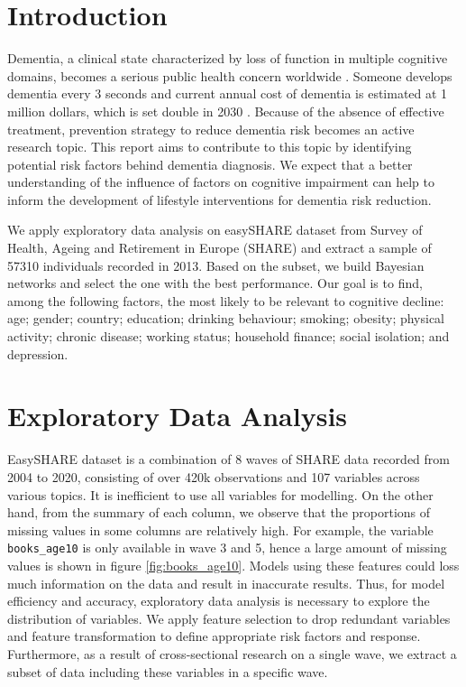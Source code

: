 \documentclass[11pt,twoside]{article}
\numberwithin{Theorem}{section}
\numberwithin{Definition}{section}
\numberwithin{Lemma}{section}
\numberwithin{Algorithm}{section}
\numberwithin{equation}{section}
\begin{document}
\tableofcontents

\setcounter{page}{1}

\nocite{*}

\clearpage

\section{Introduction}
\label{sec:intro}

Dementia, a clinical state characterized by loss of function in multiple cognitive domains, becomes a serious public health concern worldwide \cite{seixas2014bayesian}. Someone develops dementia every 3 seconds and current annual cost of dementia is estimated at 1 million dollars, which is set double in 2030 \cite{alzheimer2019world}. Because of the absence of effective treatment, prevention strategy to reduce dementia risk becomes an active research topic. This report aims to contribute to this topic by identifying potential risk factors behind dementia diagnosis. We expect that a better understanding of the influence of factors on cognitive impairment can help to inform the development of lifestyle interventions for dementia risk reduction. 

We apply exploratory data analysis on easySHARE dataset from Survey of Health, Ageing and Retirement in Europe (SHARE) and extract a sample of 57310 individuals recorded in 2013. Based on the subset, we build Bayesian networks and select the one with the best performance. Our goal is to find, among the following factors, the most likely to be relevant to cognitive decline: age; gender; country; education; drinking behaviour; smoking; obesity; physical activity; chronic disease; working status; household finance; social isolation; and depression. 

\section{Exploratory Data Analysis}  
\label{sec: EDA}

EasySHARE dataset is a combination of 8 waves of SHARE data recorded from 2004 to 2020, consisting of over 420k observations and 107 variables across various topics. It is inefficient to use all variables for modelling. On the other hand, from the summary of each column, we observe that the proportions of missing values in some columns are relatively high. For example, the variable \texttt{books\_age10} is only available in wave 3 and 5, hence a large amount of missing values is shown in figure \ref{fig:books_age10}.  Models using these features could loss much information on the data and result in inaccurate results. Thus, for model efficiency and accuracy, exploratory data analysis is necessary to explore the distribution of variables. We apply feature selection to drop redundant variables and feature transformation to define appropriate risk factors and response. Furthermore, as a result of cross-sectional research on a single wave, we extract a subset of data including these variables in a specific wave.
\end{document}
